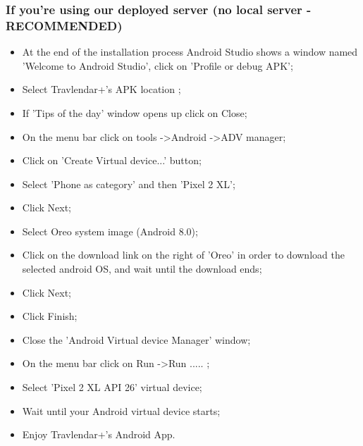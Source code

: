 \subsubsection{If you're using our deployed server (no local server - RECOMMENDED)}
\begin{itemize}
	\item At the end of the installation process Android Studio shows a window named 'Welcome to Android Studio', click on 'Profile or debug APK';
	\item Select Travlendar+'s APK location ;
	\item If 'Tips of the day' window opens up click on Close;
	\item On the menu bar click on tools -\textgreater Android -\textgreater ADV manager;
	\item Click on 'Create Virtual device...' button;
	\item Select 'Phone as category' and then 'Pixel 2 XL';
	\item Click Next;
	\item Select Oreo system image (Android 8.0);
	\item Click on the download link on the right of 'Oreo' in order to download the selected android OS, and wait until the download ends; 
	\item Click Next;
	\item Click Finish;
	\item Close the 'Android Virtual device Manager' window;
	\item On the menu bar click on Run -\textgreater Run ..... ;
	\item Select 'Pixel 2 XL API 26' virtual device;
	\item Wait until your Android virtual device starts;
	\item Enjoy Travlendar+'s Android App.	
\end{itemize}

